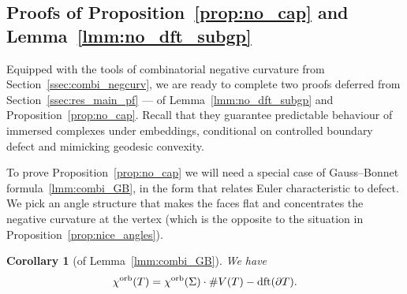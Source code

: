 \documentclass{amsart}
\newtheorem{corollary}[conjecture]{Corollary}
\newcommand{\cho}{\chi^{\textnormal{orb}}}
\newcommand{\dft}{\textnormal{dft}}
\begin{document}
\subsection{Proofs of Proposition~\ref{prop:no_cap} and Lemma~\ref{lmm:no_dft_subgp}}\label{ssec:pfs_aux_combi}

Equipped with the tools of combinatorial negative curvature from Section~\ref{ssec:combi_negcurv}, we are ready to complete two proofs deferred from Section~\ref{ssec:res_main_pf} --- of Lemma~\ref{lmm:no_dft_subgp} and Proposition~\ref{prop:no_cap}. Recall that they guarantee predictable behaviour of immersed complexes under embeddings, conditional on controlled boundary defect and mimicking geodesic convexity.

To prove Proposition~\ref{prop:no_cap} we will need a special case of Gauss--Bonnet formula~\ref{lmm:combi_GB}, in the form that relates Euler characteristic to defect. We pick an angle structure that makes the faces flat and concentrates the negative curvature at the vertex (which is the opposite to the situation in Proposition~\ref{prop:nice_angles}).
\begin{corollary}[of Lemma~\ref{lmm:combi_GB}]\label{cor:cho_V_dft}
We have
\begin{equation*}
\cho(T)=\cho(\Sigma)\cdot\#V(T)-\dft(\partial T).
\end{equation*}
\end{corollary}
\end{document}
